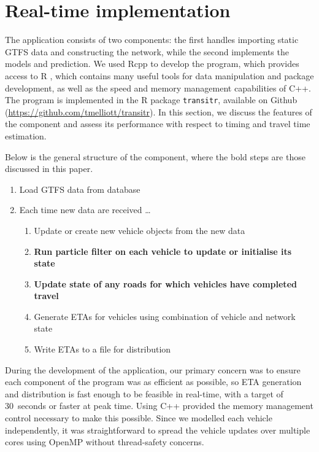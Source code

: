 \section{Real-time implementation}
\label{sec:rt}

The application consists of two components:
the first handles importing static GTFS data and constructing the network,
while the second implements the \rt models and prediction.
We used Rcpp \citep{Rcpp}
to develop the program,
which provides access to R \citep{rcore},
which contains many useful tools for data manipulation and package development,
as well as the speed and memory management capabilities of C++.
The program is implemented in the R package
\verb+transitr+, available on Github (\url{https://github.com/tmelliott/transitr}).
In this section, we discuss the features of the \rt component
and assess its performance 
with respect to timing and travel time estimation.

Below is the general structure of the \rt component, 
where the bold steps are those discussed in this paper.
\begin{enumerate}
\item Load GTFS data from database
\item Each time new data are received \ldots
\begin{enumerate}
    \item Update or create new vehicle objects from the new data
    \item \textbf{Run particle filter on each vehicle to update or initialise its state}
    \item \textbf{Update state of any roads for which vehicles 
        have completed travel}
    \item Generate ETAs for vehicles using combination of vehicle and network state
    \item Write ETAs to a file for distribution
\end{enumerate}
\end{enumerate}


During the development of the application,
our primary concern was to ensure each component of the program
was as efficient as possible,
so ETA generation and distribution is fast enough to be feasible in real-time,
with a target of 30~seconds or faster at peak time.
Using C++ provided the memory management control necessary to make this possible.
Since we modelled each vehicle independently, 
it was straightforward to spread the vehicle updates 
over multiple cores using OpenMP without thread-safety concerns.


